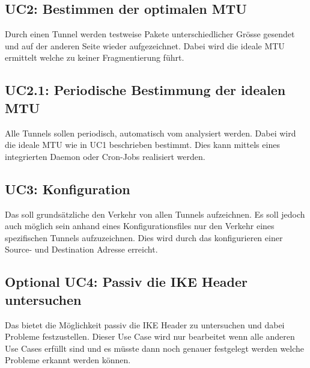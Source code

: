 \subsection{UC2: Bestimmen der optimalen MTU}
Durch einen Tunnel werden testweise Pakete unterschiedlicher Grösse gesendet und auf der anderen Seite wieder aufgezeichnet. Dabei wird die ideale MTU ermittelt welche zu keiner Fragmentierung führt.

\subsection{UC2.1: Periodische Bestimmung der idealen MTU}
Alle Tunnels sollen periodisch, automatisch vom \tool analysiert werden. Dabei wird die ideale MTU wie in UC1 beschrieben bestimmt. Dies kann mittels eines integrierten Daemon oder Cron-Jobs realisiert werden.

\subsection{UC3: Konfiguration}
Das \tool soll grundsätzliche den Verkehr von allen Tunnels aufzeichnen. Es soll jedoch auch möglich sein anhand eines Konfigurationsfiles nur den Verkehr eines spezifischen Tunnels aufzuzeichnen. Dies wird durch das konfigurieren einer Source- und Destination Adresse erreicht.

\subsection{Optional UC4: Passiv die IKE Header untersuchen}
Das \tool bietet die Möglichkeit passiv die IKE Header zu untersuchen und dabei Probleme festzustellen. Dieser Use Case wird nur bearbeitet wenn alle anderen Use Cases erfüllt sind und es müsste dann noch genauer festgelegt werden welche Probleme erkannt werden können.